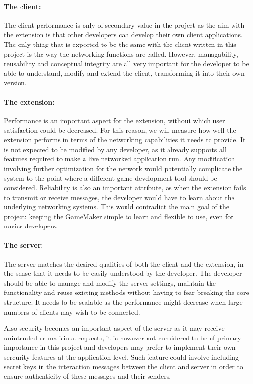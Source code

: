 \documentclass[bsc,frontabs,twoside,singlespacing,parskip,deptreport]{infthesis}     %
\begin{document}
\paragraph*{The client:}
The client performance is only of secondary value in the project as the aim with the extension is that other developers can develop their own client applications. The only thing that is expected to be the same with the client written in this project is the way the networking functions are called. However, managability, reusability and conceptual integrity are all very important for the developer to be able to understand, modify and extend the client, transforming it into their own version.

\paragraph*{The extension:}
Performance is an important aspect for the extension, without which user satisfaction could be decreased. For this reason, we will measure how well the extension performs in terms of the networking capabilities it needs to provide. It is not expected to be modified by any developer, as it already supports all features required to make a live networked application run. Any modification involving further optimization for the network would potentially complicate the system to the point where a different game development tool should be considered. Reliability is also an important attribute, as when the extension fails to transmit or receive messages, the developer would have to learn about the underlying networking systems. This would contradict the main goal of the project: keeping the GameMaker simple to learn and flexible to use, even for novice developers.

\paragraph*{The server:}
The server matches the desired qualities of both the client and the extension, in the sense that it needs to be easily understood by the developer. The developer should be able to manage and modify the server settings, maintain the functionality and reuse existing methods without having to fear breaking the core structure. It needs to be scalable as the performance might decrease when large numbers of clients may wish to be connected. 

Also security becomes an important aspect of the server as it may receive unintended or malicious requests, it is however not considered to be of primary importance in this project and developers may prefer to implement their own sercurity features at the application level. Such feature could involve including secret keys in the interaction messages between the client and server in order to ensure authenticity of these messages and their senders.
\end{document}
